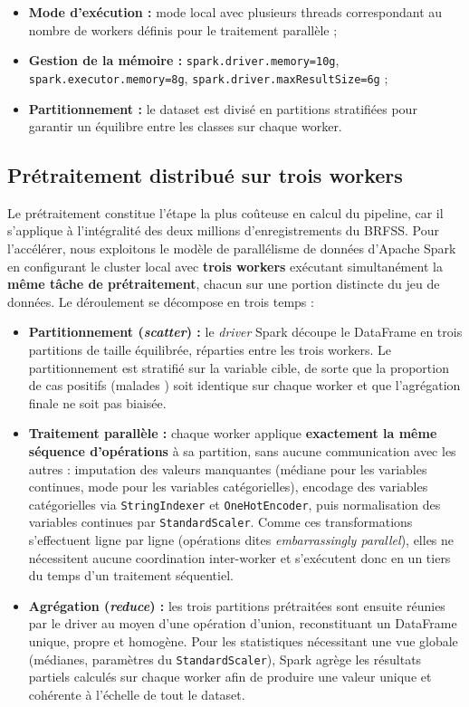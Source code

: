 \documentclass[12pt,a4paper]{report}
\begin{document}
\begin{itemize}
  \item \textbf{Mode d'exécution :} mode local avec plusieurs threads correspondant
    au nombre de workers définis pour le traitement parallèle ;
  \item \textbf{Gestion de la mémoire :} \texttt{spark.driver.memory=10g},
    \texttt{spark.executor.memory=8g}, \texttt{spark.driver.maxResultSize=6g} ;
  \item \textbf{Partitionnement :} le dataset est divisé en partitions stratifiées
    pour garantir un équilibre entre les classes sur chaque worker.
\end{itemize}

\subsection{Prétraitement distribué sur trois workers}

Le prétraitement constitue l'étape la plus coûteuse en calcul du pipeline, car il
s'applique à l'intégralité des deux millions d'enregistrements du \acs{BRFSS}. Pour
l'accélérer, nous exploitons le modèle de parallélisme de données d'Apache Spark en
configurant le cluster local avec \textbf{trois workers} exécutant simultanément la
\textbf{même tâche de prétraitement}, chacun sur une portion distincte du jeu de
données. Le déroulement se décompose en trois temps :

\begin{itemize}
  \item \textbf{Partitionnement (\textit{scatter}) :} le \textit{driver} Spark découpe
    le DataFrame en trois partitions de taille équilibrée, réparties entre les trois
    workers. Le partitionnement est stratifié sur la variable cible, de sorte que la
    proportion de cas positifs (\og malades \fg{}) soit identique sur chaque worker
    et que l'agrégation finale ne soit pas biaisée.
  \item \textbf{Traitement parallèle :} chaque worker applique \textbf{exactement la
    même séquence d'opérations} à sa partition, sans aucune communication avec les
    autres : imputation des valeurs manquantes (médiane pour les variables continues,
    mode pour les variables catégorielles), encodage des variables catégorielles via
    \texttt{StringIndexer} et \texttt{OneHotEncoder}, puis normalisation des variables
    continues par \texttt{StandardScaler}. Comme ces transformations s'effectuent
    ligne par ligne (opérations dites \textit{embarrassingly parallel}), elles ne
    nécessitent aucune coordination inter-worker et s'exécutent donc en un tiers du
    temps d'un traitement séquentiel.
  \item \textbf{Agrégation (\textit{reduce}) :} les trois partitions prétraitées sont
    ensuite réunies par le driver au moyen d'une opération d'union, reconstituant un
    DataFrame unique, propre et homogène. Pour les statistiques nécessitant une vue
    globale (médianes, paramètres du \texttt{StandardScaler}), Spark agrège les
    résultats partiels calculés sur chaque worker afin de produire une valeur unique
    et cohérente à l'échelle de tout le dataset.
\end{itemize}
\end{document}

